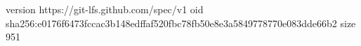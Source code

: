 version https://git-lfs.github.com/spec/v1
oid sha256:e0176f6473fccac3b148edffaf520fbc78fb50e8e3a5849778770e083dde66b2
size 951
